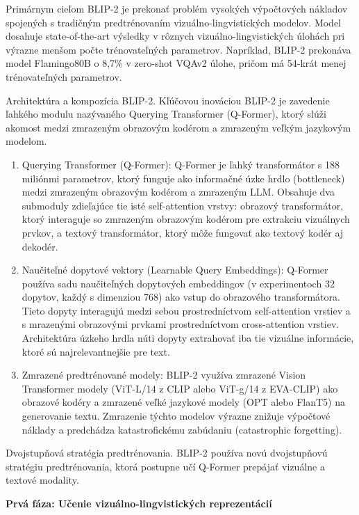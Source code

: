 \documentclass[]{tukediphc}
\begin{document}
Primárnym cieľom BLIP-2 je prekonať problém vysokých výpočtových nákladov spojených s tradičným predtrénovaním vizuálno-lingvistických modelov. Model dosahuje state-of-the-art výsledky v rôznych vizuálno-lingvistických úlohách pri výrazne menšom počte trénovateľných parametrov. Napríklad, BLIP-2 prekonáva model Flamingo80B o 8,7\% v zero-shot VQAv2 úlohe, pričom má 54-krát menej trénovateľných parametrov.

Architektúra a kompozícia BLIP-2. Kľúčovou inováciou BLIP-2 je zavedenie ľahkého modulu nazývaného Querying Transformer (Q-Former), ktorý slúži akomost medzi zmrazeným obrazovým kodérom a zmrazeným veľkým jazykovým modelom.

\begin{enumerate}
    \item Querying Transformer (Q-Former): Q-Former je ľahký transformátor s 188 miliónmi parametrov, ktorý funguje ako informačné úzke hrdlo (bottleneck) medzi zmrazeným obrazovým kodérom a zmrazeným LLM. Obsahuje dva submoduly zdieľajúce tie isté self-attention vrstvy: obrazový transformátor, ktorý interaguje so zmrazeným obrazovým kodérom pre extrakciu vizuálnych prvkov, a textový transformátor, ktorý môže fungovať ako textový kodér aj dekodér\cite{BLIP2}.
    
    \item Naučiteľné dopytové vektory (Learnable Query Embeddings): Q-Former používa sadu naučiteľných dopytových embeddingov (v experimentoch 32 dopytov, každý s dimenziou 768) ako vstup do obrazového transformátora. Tieto dopyty interagujú medzi sebou prostredníctvom self-attention vrstiev a s mrazenými obrazovými prvkami prostredníctvom cross-attention vrstiev. Architektúra úzkeho hrdla núti dopyty extrahovať iba tie vizuálne informácie, ktoré sú najrelevantnejšie pre text.
    
    \item Zmrazené predtrénované modely: BLIP-2 využíva zmrazené Vision Transformer modely (ViT-L/14 z CLIP alebo ViT-g/14 z EVA-CLIP) ako obrazové kodéry a zmrazené veľké jazykové modely (OPT alebo FlanT5) na generovanie textu. Zmrazenie týchto modelov výrazne znižuje výpočtové náklady a predchádza katastrofickému zabúdaniu (catastrophic forgetting)\cite{BLIP2}.
\end{enumerate}

Dvojstupňová stratégia predtrénovania. BLIP-2 používa novú dvojstupňovú stratégiu predtrénovania, ktorá postupne učí Q-Former prepájať vizuálne a textové modality.

\textbf{Prvá fáza: Učenie vizuálno-lingvistických reprezentácií}
\end{document}
